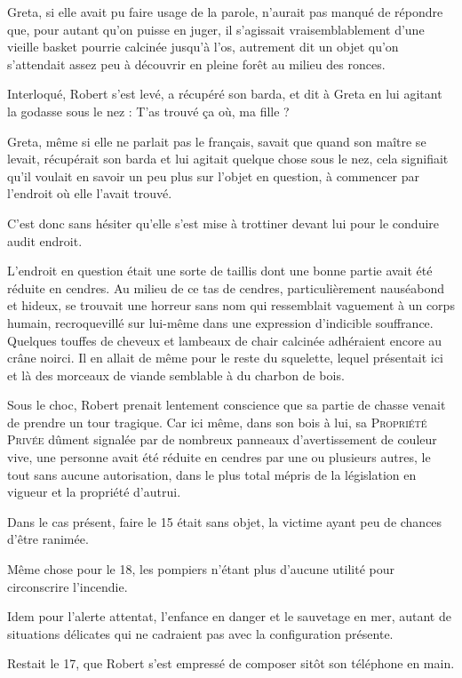 Greta, si elle avait pu faire usage de la parole, n’aurait pas manqué de répondre que, pour autant qu’on puisse en juger, il s’agissait vraisemblablement d’une vieille basket pourrie calcinée jusqu’à l’os, autrement dit un objet qu’on s’attendait assez peu à découvrir en pleine forêt au milieu des ronces.

Interloqué, Robert s’est levé, a récupéré son barda, et dit à Greta en lui agitant la godasse sous le nez : T’as trouvé ça où, ma fille ?

Greta, même si elle ne parlait pas le français, savait que quand son maître se levait, récupérait son barda et lui agitait quelque chose sous le nez, cela signifiait qu’il voulait en savoir un peu plus sur l’objet en question, à commencer par l’endroit où elle l’avait trouvé.

C’est donc sans hésiter qu’elle s’est mise à trottiner devant lui pour le conduire audit endroit.

L’endroit en question était une sorte de taillis dont une bonne partie avait été réduite en cendres. Au milieu de ce tas de cendres, particulièrement nauséabond et hideux, se trouvait une horreur sans nom qui ressemblait vaguement à un corps humain, recroquevillé sur lui-même dans une expression d’indicible souffrance. Quelques touffes de cheveux et lambeaux de chair calcinée adhéraient encore au crâne noirci. Il en allait de même pour le reste du squelette, lequel présentait ici et là des morceaux de viande semblable à du charbon de bois.

Sous le choc, Robert prenait lentement conscience que sa partie de chasse venait de prendre un tour tragique. Car ici même, dans son bois à lui, sa \textsc{Propriété Privée} dûment signalée par de nombreux panneaux d’avertissement de couleur vive, une personne avait été réduite en cendres par une ou plusieurs autres, le tout sans aucune autorisation, dans le plus total mépris de la législation en vigueur et la propriété d’autrui.

Dans le cas présent, faire le 15 était sans objet, la victime ayant peu de chances d’être ranimée.

Même chose pour le 18, les pompiers n’étant plus d’aucune utilité pour circonscrire l’incendie.

%
Idem pour l’alerte attentat, l’enfance en danger et le sauvetage en mer, autant de situations délicates qui ne cadraient pas avec la configuration présente.

Restait le 17, que Robert s’est empressé de composer sitôt son téléphone en main.

